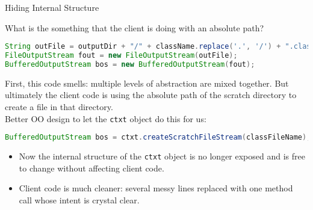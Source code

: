 \documentclass{beamer}
\begin{document}
\begin{frame}[fragile]{Hiding Internal Structure}


What is the something that the client is doing with an absolute path?
\begin{lstlisting}[language=Java]
String outFile = outputDir + "/" + className.replace('.', '/') + ".class";
FileOutputStream fout = new FileOutputStream(outFile);
BufferedOutputStream bos = new BufferedOutputStream(fout);
\end{lstlisting}
First, this code smells: multiple levels of abstraction are mixed together.  But ultimately the client code is using the absolute path of the scratch directory to create a file in that directory.\\
\vspace{.1in}
Better OO design to let the {\tt ctxt} object do this for us:
\begin{lstlisting}[language=Java]
BufferedOutputStream bos = ctxt.createScratchFileStream(classFileName);
\end{lstlisting}
\begin{itemize}
\item Now the internal structure of the {\tt ctxt} object is no longer exposed and is free to change without affecting client code.
\item Client code is much cleaner: several messy lines replaced with one method call whose intent is crystal clear.
\end{itemize}

\end{frame}
\end{document}
